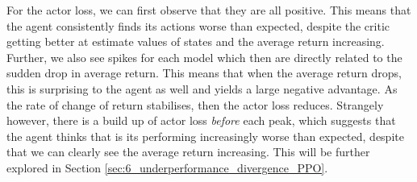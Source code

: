 For the actor loss, we can first observe that they are all positive. This means that the agent consistently finds its actions worse than expected, despite the critic getting better at estimate values of states and the average return increasing. Further, we also see spikes for each model which then are directly related to the sudden drop in average return. This means that when the average return drops, this is surprising to the agent as well and yields a large negative advantage. As the rate of change of return stabilises, then the actor loss reduces. Strangely however, there is a build up of actor loss \textit{before} each peak, which suggests that the agent thinks that is its performing increasingly worse than expected, despite that we can clearly see the average return increasing. This will be further explored in Section \ref{sec:6_underperformance_divergence_PPO}.

